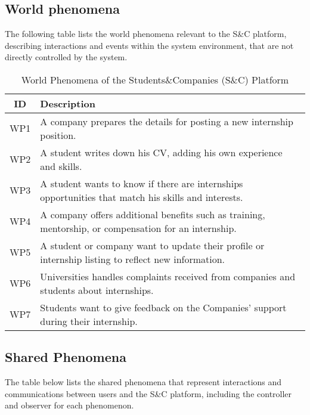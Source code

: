 \subsection{World phenomena}

The following table lists the world phenomena relevant to the S\&C platform, describing interactions and events within the system environment, that are not directly controlled by the system.


\begin{table}[h!]
\renewcommand{\arraystretch}{1.5}
\centering
\begin{tabular}{|c|p{12cm}|}
\hline
\textbf{ID} & \textbf{Description} \\
\hline
WP1 & A company prepares the details for posting a new internship position.\\
\hline
WP2 & A student writes down his CV, adding his own experience and skills.\\
\hline
WP3 & A student wants to know if there are  internships opportunities that match his skills and interests. \\
\hline
WP4 & A company offers additional benefits such as training, mentorship, or compensation for an internship. \\
\hline
WP5 & A student or company want to update their profile or internship listing to reflect new information. \\
\hline
WP6 & Universities handles complaints received from companies and students about internships. \\
\hline
WP7 & Students want to give feedback on the Companies' support during their internship.\\
\hline
\end{tabular}
\caption{World Phenomena of the Students\&Companies (S\&C) Platform}
\end{table}

\subsection{Shared Phenomena}

The table below lists the shared phenomena that represent interactions and communications between users and the S\&C platform, including the controller and observer for each phenomenon.

